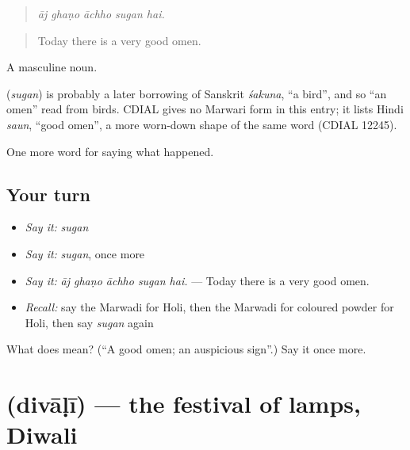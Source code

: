 \begin{quote}
    
\end{quote}

\begin{quote}
\emph{āj ghaṇo āchho sugan hai.}
\end{quote}

\begin{quote}
Today there is a very good omen.
\end{quote}

A masculine noun.

\begin{cousinweb}
\textbf{} (\emph{sugan}) is probably a later borrowing of Sanskrit \emph{śakuna}, \textquotedblleft{}a bird\textquotedblright{}, and so \textquotedblleft{}an omen\textquotedblright{} read from birds. CDIAL gives no Marwari form in this entry; it lists Hindi \emph{saun}, \textquotedblleft{}good omen\textquotedblright{}, a more worn-down shape of the same word (CDIAL 12245).
\end{cousinweb}

\begin{grammarlens}[title={What you've built}]
One more word for saying what happened.
\end{grammarlens}

\subsection*{Your turn}
\begin{itemize}
\raggedright
  \item \emph{Say it:} \emph{sugan}
  \item \emph{Say it:} \emph{sugan}, once more
  \item \emph{Say it:} \emph{āj ghaṇo āchho sugan hai.} — Today there is a very good omen.
  \item \emph{Recall:} say the Marwadi for Holi, then the Marwadi for coloured powder for Holi, then say \emph{sugan} again
\end{itemize}

\begin{tcolorbox}[breakable,colback=teal!4,colframe=teal!35!black,title={Before you move on}]
What does  mean? (\textquotedblleft{}A good omen; an auspicious sign\textquotedblright{}.) Say it once more.
\end{tcolorbox}
\section[\texorpdfstring{\mw{दिवाळी} (divāḷī)}{दिवाळी (divāḷī)}]{ (divāḷī) — the festival of lamps, Diwali}

